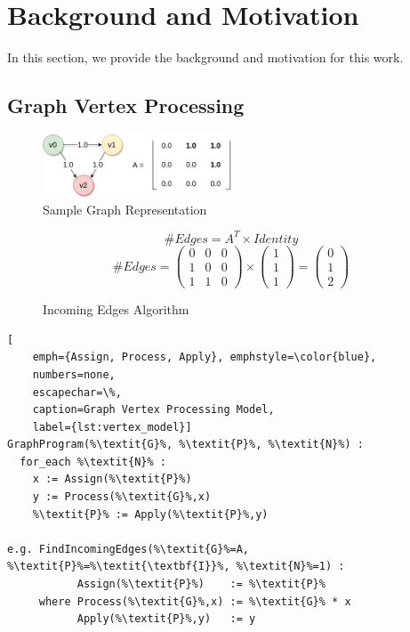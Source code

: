 \section{Background and Motivation}

In this section, we provide the background and motivation for this work.

\subsection{Graph Vertex Processing}

\begin{figure}[htbp]
\centering
\includegraphics[width=0.5\textwidth]{figures/sample_graph}
\caption{Sample Graph Representation}
\label{fig:sample_graph}
\end{figure}

\begin{figure}[htbp] 
\begin{equation}
\#Edges = A^{T} \times Identity
\end{equation}
\begin{equation}
\#Edges = 
\left(\begin{array}{ccc} 0 & 0 & 0 \\ 1 & 0 & 0 \\ 1 & 1 & 0 \end{array}\right) \times
\left(\begin{array}{c} 1 \\ 1 \\ 1 \end{array}\right) 
= \left(\begin{array}{c} 0 \\ 1 \\ 2 \end{array}\right) 
\end{equation}
\caption{Incoming Edges Algorithm}
\label{fig:sample_algorithm}
\end{figure} 

\begin{lstlisting}[
	emph={Assign, Process, Apply}, emphstyle=\color{blue}, 
	numbers=none, 
	escapechar=\%, 
	caption=Graph Vertex Processing Model,
	label={lst:vertex_model}]
GraphProgram(%\textit{G}%, %\textit{P}%, %\textit{N}%) :
  for_each %\textit{N}% :
    x := Assign(%\textit{P}%)
  	y := Process(%\textit{G}%,x)
  	%\textit{P}% := Apply(%\textit{P}%,y)	  
  
e.g. FindIncomingEdges(%\textit{G}%=A, %\textit{P}%=%\textit{\textbf{I}}%, %\textit{N}%=1) :
           Assign(%\textit{P}%)    := %\textit{P}%
     where Process(%\textit{G}%,x) := %\textit{G}% * x
           Apply(%\textit{P}%,y)   := y
\end{lstlisting}

